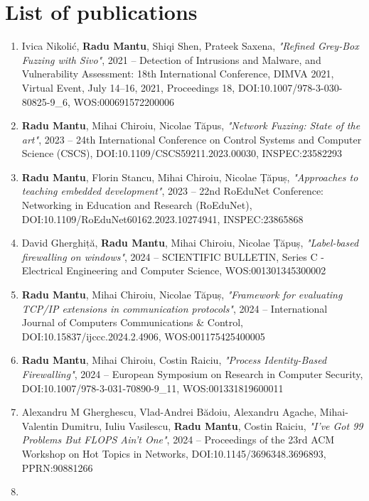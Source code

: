 
\section{List of publications}
\label{conclusion:publications}
{

\begin{enumerate}
    \item Ivica Nikolić, \textbf{Radu Mantu}, Shiqi Shen, Prateek Saxena,
          \textit{"Refined Grey-Box Fuzzing with Sivo"},
          2021 -- Detection of Intrusions and Malware, and Vulnerability
          Assessment: 18th International Conference, DIMVA 2021, Virtual
          Event, July 14–16, 2021, Proceedings 18,
          DOI:10.1007/978-3-030-80825-9\_6, WOS:000691572200006

    \item \textbf{Radu Mantu}, Mihai Chiroiu, Nicolae Tăpus,
          \textit{"Network Fuzzing: State of the art"},
          2023 -- 24th International Conference on Control Systems and Computer
          Science (CSCS),
          DOI:10.1109/CSCS59211.2023.00030, INSPEC:23582293

    \item \textbf{Radu Mantu}, Florin Stancu, Mihai Chiroiu, Nicolae Țăpuș,
          \textit{"Approaches to teaching embedded development"},
          2023 -- 22nd RoEduNet Conference: Networking in Education and Research
          (RoEduNet),
          DOI:10.1109/RoEduNet60162.2023.10274941, INSPEC:23865868

    \item David Gherghiță, \textbf{Radu Mantu}, Mihai Chiroiu, Nicolae Țăpuș,
          \textit{"Label-based firewalling on windows"},
          2024 -- SCIENTIFIC BULLETIN, Series C - Electrical Engineering and
          Computer Science,
          WOS:001301345300002

    \item \textbf{Radu Mantu}, Mihai Chiroiu, Nicolae Tăpuș,
          \textit{"Framework for evaluating TCP/IP extensions in communication
          protocols"},
          2024 -- International Journal of Computers Communications \& Control,
          DOI:10.15837/ijccc.2024.2.4906, WOS:001175425400005

    \item \textbf{Radu Mantu}, Mihai Chiroiu, Costin Raiciu,
          \textit{"Process Identity-Based Firewalling"},
          2024 -- European Symposium on Research in Computer Security,
          DOI:10.1007/978-3-031-70890-9\_11, WOS:001331819600011

    \item Alexandru M Gherghescu, Vlad-Andrei Bădoiu, Alexandru Agache,
          Mihai-Valentin Dumitru, Iuliu Vasilescu, \textbf{Radu Mantu}, Costin
          Raiciu,
          \textit{"I've Got 99 Problems But FLOPS Ain't One"},
          2024 -- Proceedings of the 23rd ACM Workshop on Hot Topics in
          Networks,
          DOI:10.1145/3696348.3696893, PPRN:90881266

    \item {}
\end{enumerate}
}

